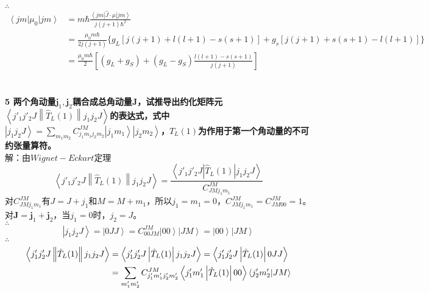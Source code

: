 \documentclass[12pt]{article}
\numberwithin{equation}{section}	 %
\begin{document}
\begin{spacing}{1.5}
$\therefore$
\begin{equation}\nonumber 		%
\begin{aligned}
\left< jm \right| \mu_{0} \left| jm \right> &= m\hbar \frac{\left< jm \right| \hat{J}\cdot\hat{\mu} \left| jm \right>}{j(j+1)\hbar^{2}} \\
&= \frac{\mu_{0}m\hbar}{2j(j+1)}\{ g_{L}[j(j+1)+l(l+1)-s(s+1)]+g_{s}[j(j+1)+s(s+1)-l(l+1)] \} \\
&= \frac{\mu_{0}m\hbar}{2}\left[ (g_{L}+g_{S})+(g_{L}-g_{S})\frac{l(l+1)-s(s+1)}{j(j+1)} \right]
\end{aligned}
\end{equation}
~\\
~\\
\textbf{5 \quad 两个角动量$\bm j_{1},\bm j_{2}$耦合成总角动量$\bm J$，试推导出约化矩阵元$\displaystyle\left< j'_{1}j'_{2}J \left\| \hat{T}_{L}(1) \right\| j_{1}j_{2}J \right>$的表达式，式中$\displaystyle \left| j_{1}j_{2}J\right>=\sum\limits_{m_{1}m_{2}}C^{JM}_{j_{1}m_{1}j_{2}m_{2}}\left| j_{1}m_{1}\right>\left| j_{2}m_{2}\right>$，$\hat{T}_{L}(1)$为作用于第一个角动量的不可约张量算符。}\\
解：由$Wignet-Eckart$定理
\begin{equation}
\left< j'_{1}j'_{2}J \left\| \hat{T}_{L}(1) \right\| j_{1}j_{2}J \right> = \frac{\left< j'_{1}j'_{2}J \left| \hat{T}_{L}(1) \right| j_{1}j_{2}J \right>}{C^{JM}_{JMj_{1}m_{1}}}
\end{equation}
对$C^{JM}_{JMj_{1}m_{1}}$有$J=J+j_{1}$和$M=M+m_{1}$，所以$j_{1}=m_{1}=0$，$C^{JM}_{JMj_{1}m_{1}}=C^{JM}_{JM00}=1$。\\
对$\bm J=\bm j_{1}+\bm j_{2}$，当$j_{1}=0$时，$j_{2}=J$。\\
$\therefore$
\begin{equation}
\left| j_{1}j_{2}J \right> = \left| 0JJ \right> = C^{JM}_{00JM}\left|00\right> \left|JM\right> = \left|00\right> \left|JM\right>
\end{equation}
$\therefore$
\begin{align} 		%
\left< j'_{1}j'_{2}J \left\| \hat{T}_{L}(1) \right\| j_{1}j_{2}J \right> &= \left< j'_{1}j'_{2}J \left| \hat{T}_{L}(1) \right| j_{1}j_{2}J \right> = \left< j'_{1}j'_{2}J \left| \hat{T}_{L}(1) \right| 0JJ \right> \notag \\		%
&= \sum_{m'_{1}m'_{2}}C^{JM}_{j'_{1}m'_{1}j'_{2}m'_{2}}\left<j'_{1}m'_{1}\left| \hat{T}_{L}(1) \right|00\right>\left<j'_{2}m'_{2}|JM\right> \notag \\

\end{align}
\end{spacing}
\end{document}
